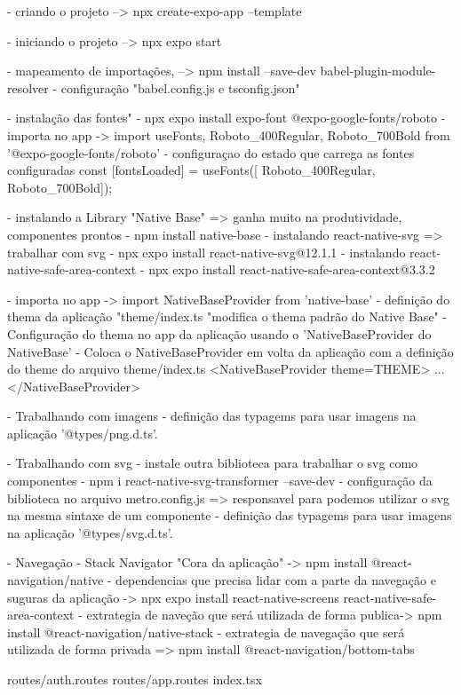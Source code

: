 - criando o projeto --> npx create-expo-app --template

- iniciando o projeto --> npx expo start

- mapeamento de importações, --> npm install --save-dev babel-plugin-module-resolver
- configuração "babel.config.js e tsconfig.json"

- instalação das fontes"
- npx expo install expo-font @expo-google-fonts/roboto
- importa no app -> import {useFonts, Roboto_400Regular, Roboto_700Bold } from '@expo-google-fonts/roboto'
- configuraçao do estado que carrega as fontes configuradas const [fontsLoaded] = useFonts([ Roboto_400Regular, Roboto_700Bold]);


- instalando a Library "Native Base" => ganha muito na produtividade, componentes prontos
- npm install native-base
- instalando react-native-svg => trabalhar com svg
- npx expo install react-native-svg@12.1.1
- instalando react-native-safe-area-context
- npx expo install react-native-safe-area-context@3.3.2

- importa no app -> import { NativeBaseProvider } from 'native-base'
- definição do thema da aplicação "theme/index.ts "modifica o thema padrão do Native Base"
- Configuração do thema no app da aplicação usando o 'NativeBaseProvider do NativeBase'
- Coloca o NativeBaseProvider em volta da aplicação com a definição do theme do arquivo theme/index.ts
<NativeBaseProvider theme={THEME}>
...
</NativeBaseProvider>

- Trabalhando com imagens
- definição das typagems para usar imagens na aplicação '@types/png.d.ts'.

- Trabalhando com svg
- instale outra biblioteca para trabalhar o svg como componentes
- npm i react-native-svg-transformer --save-dev
- configuração da biblioteca no arquivo metro.config.js => responsavel para podemos utilizar o svg na mesma sintaxe de um componente
- definição das typagems para usar imagens na aplicação '@types/svg.d.ts'.

- Navegação
- Stack Navigator  "Cora da aplicação" -> npm install @react-navigation/native
- dependencias que precisa lidar com a parte da navegação e suguras da aplicação -> npx expo install react-native-screens react-native-safe-area-context
- extrategia de naveção que será utilizada de forma publica-> npm install @react-navigation/native-stack
- extrategia de navegação que será utilizada de forma privada => npm install @react-navigation/bottom-tabs

routes/auth.routes
routes/app.routes
index.tsx

